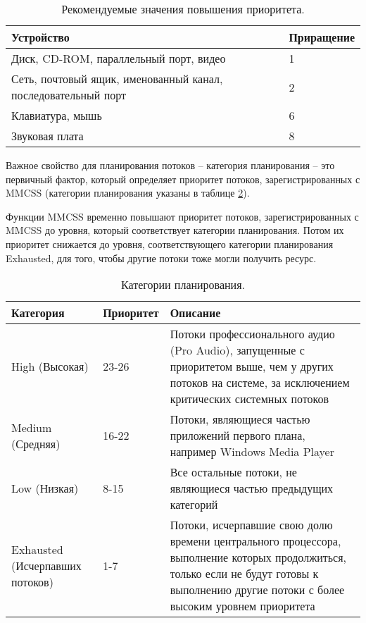 \begin{table}[h!]
	\caption{Рекомендуемые значения повышения приоритета.}
	\begin{center}
		\begin{tabular}{|p{100mm}|l|}
			\hline
			\textbf{Устройство} & \textbf{Приращение} \\
			\hline
			Диск, CD-ROM, параллельный порт, видео & 1 \\
			\hline
			Сеть, почтовый ящик, именованный канал, последовательный порт & 2 \\
			\hline
			Клавиатура, мышь & 6 \\
			\hline
			Звуковая плата & 8 \\
			\hline
		\end{tabular}
	\end{center}
	\label{tab:io}
\end{table}

\newpage
Важное свойство для планирования потоков -- категория планирования -- это первичный фактор, который определяет приоритет потоков, зарегистрированных с MMCSS (категории планирования указаны в таблице \ref{tab:plan}).

Функции MMCSS временно повышают приоритет потоков, зарегистрированных с MMCSS до уровня, который соответствует категории планирования. Потом их приоритет снижается до уровня, соответствующего категории планирования Exhausted, для того, чтобы другие потоки тоже могли получить ресурс.


\begin{table}[h]
	\caption{Категории планирования.}
	\begin{center}
		\begin{tabular}{|p{40mm}|p{30mm}|p{80mm}|}
			\hline
			\textbf{Категория} & \textbf{Приоритет} & \textbf{Описание} \\
			\hline
			High (Высокая) & 23-26 & Потоки профессионального аудио (Pro Audio), запущенные с приоритетом выше, чем у других потоков на системе, за исключением критических системных потоков \\
			\hline
			Medium (Средняя) & 16-22 & Потоки, являющиеся частью приложений первого плана, например Windows Media Player \\
			\hline
			Low (Низкая) & 8-15 & Все остальные потоки, не являющиеся частью предыдущих категорий \\
			\hline
			Exhausted (Исчерпавших потоков) & 1-7 & Потоки, исчерпавшие свою долю времени центрального процессора, выполнение которых продолжиться, только если не будут готовы к выполнению другие потоки с более высоким уровнем приоритета \\
			\hline
		\end{tabular}
	\end{center}
	\label{tab:plan}
\end{table}


